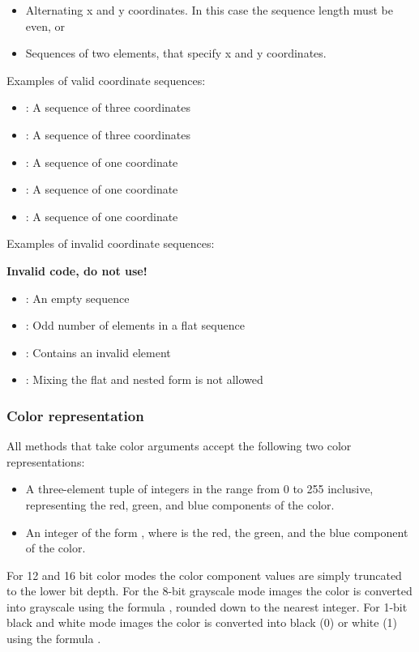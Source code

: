 \begin{itemize}
\item Alternating x and y coordinates. In this case the sequence length must be even, or
\item Sequences of two elements, that specify x and y coordinates.
\end{itemize}
Examples of valid coordinate sequences:

\begin{itemize}
\item {}: A sequence of three coordinates
\item \code{[(1,221L),(3,4),[5.12,6])}: A sequence of three coordinates
\item {}: A sequence of one coordinate
\item \code{[(1,5)]}: A sequence of one coordinate
\item \code{[[1,5]]}: A sequence of one coordinate
\end{itemize}

Examples of invalid coordinate sequences:

\textbf{Invalid code, do not use!}
\begin{itemize}
\item \code{[]}: An empty sequence
\item {}: Odd number of elements in a flat sequence
\item \code{[(1,2),(3,4),None]}: Contains an invalid element
\item {}: Mixing the flat and nested form is not allowed
\end{itemize}

\subsubsection{Color representation}
\label{subsubsec:color}
All methods that take color arguments accept the following two color 
representations:

\begin{itemize}
\item A three-element tuple of integers in the range from 0 to 255 inclusive, representing the red, green, and blue components of the color.
\item An integer of the form , where  is the red,  the green, and  the blue component of the color. 
\end{itemize}
For 12 and 16 bit color modes the color component values are simply 
truncated to the lower bit depth. For the 8-bit grayscale mode images the 
color is converted into grayscale using the formula , rounded 
down to the nearest integer. For 1-bit black and white mode images the color 
is converted into black (0) or white (1) using the formula .

